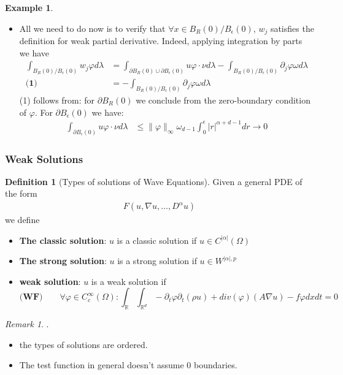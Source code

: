 \documentclass[a4paper,11pt,oneside,fleqn]{book}
\theoremstyle{definition}
\newtheorem{definition}{Definition}[section]
\newtheorem*{example}{Example}
\theoremstyle{remark}
\newtheorem*{remark}{Remark}
\begin{document}
\begin{example}
\begin{itemize}
\begin{align*}
		&= \lim_{\epsilon \rightarrow 0}- \int_{B_R(0)\slash B_\epsilon (0)} u \partial_j \varphi  d\lambda
	\end{align*} 
	Given the condition that $w_j$, $u$ are in $L^p$. Notice that $u \in L^p$ implies that $w_j \in L^p$.
	\item All we need to do now is to verify that $\forall x \in B_R(0) \slash B_\epsilon(0)$, $w_j$ satisfies the definition for weak partial derivative. Indeed, applying integration by parts we have
	\begin{align*}
		\int_{B_R(0)\slash B_\epsilon (0)} w_j \varphi d\lambda &= \int_{\partial B_R(0) \cup \partial B_\epsilon(0)} u \varphi \cdot \nu  d\lambda - \int_{B_R(0)\slash B_\epsilon (0)} \partial_j \varphi \omega d\lambda\\
		\textbf{(1)}&=  - \int_{B_R(0)\slash B_\epsilon (0)} \partial_j \varphi \omega d\lambda
	\end{align*}
	(1) follows from: for $\partial B_R(0)$ we conclude from the zero-boundary condition of $\varphi$. For $\partial B_\epsilon(0)$ we have:
	\begin{align*}
		\int_{\partial B_\epsilon(0)}u \varphi \cdot \nu d \lambda &\leq \|\varphi\|_\infty \omega_{d-1} \int_0^\epsilon |r|^{\alpha + d -1} dr \rightarrow 0
	\end{align*}
\end{itemize}
\end{example}


\subsubsection{Weak Solutions}
\begin{definition}[Types of solutions of Wave Equations]
	Given a general PDE of the form 
	\begin{align*}
		F(u, \nabla u, \dots,  D^\alpha u)
	\end{align*}
	we define
	\begin{itemize}
		\item \textbf{The classic solution}: $u$ is a classic solution if $u \in C^{|\alpha|}(\Omega)$
		\item \textbf{The strong solution}: $u$ is a strong solution if $u \in W^{|\alpha|, p}$
		\item \textbf{weak solution}: $u$ is a weak solution if
		\begin{equation*}
		\textbf{(WF)} \qquad
		 	\forall \varphi \in C_c^\infty(\Omega):
		 	\int_\mathbb{R} \int_{\mathbb{R}^d} - \partial_t \varphi \partial_t(\rho u)  + div(\varphi) (A \nabla u) - f \varphi dxdt	= 0
		\end{equation*}
	\end{itemize}
\end{definition}
\begin{remark}.
\begin{itemize}
	\item the types of solutions are ordered.
	\item The test function in general doesn't assume $0$ boundaries. 
\end{itemize}	
\end{remark}
\end{document}
